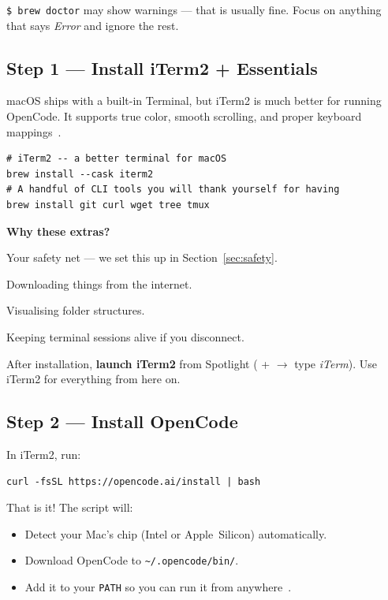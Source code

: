 \documentclass[11pt]{article}
\newcommand{\cmd}[1]{\texttt{\$ #1}}
\newcommand{\key}[1]{\keystroke{#1}}
\newcommand{\keystroke}[1]{%
  \tikz[baseline=(key.base)]{%
    \node[draw, rounded corners=2pt, inner sep=2pt, fill=gray!10,
          font=\ttfamily\small] (key) {#1};%
  }%
}
\begin{document}
\cmd{brew doctor} may show warnings --- that is usually fine.  Focus on anything that says \emph{Error} and ignore the rest.

\subsection{Step 1 --- Install iTerm2 + Essentials}

macOS ships with a built-in Terminal, but iTerm2 is much better for running OpenCode.  It supports true color, smooth scrolling, and proper keyboard mappings~\cite{iterm2026}.

\begin{lstlisting}[style=term]
# iTerm2 -- a better terminal for macOS
brew install --cask iterm2
# A handful of CLI tools you will thank yourself for having
brew install git curl wget tree tmux
\end{lstlisting}

\begin{ex-box}
\textbf{Why these extras?}
\begin{description}[nosep, leftmargin=1.6cm]
  \item[\texttt{git}] Your safety net --- we set this up in Section~\ref{sec:safety}.
  \item[\texttt{curl}/\texttt{wget}] Downloading things from the internet.
  \item[\texttt{tree}] Visualising folder structures.
  \item[\texttt{tmux}] Keeping terminal sessions alive if you disconnect.
\end{description}
\end{ex-box}

After installation, \textbf{launch iTerm2} from Spotlight (\key{Cmd}+\key{Space} $\to$ type \emph{iTerm}).  Use iTerm2 for everything from here on.

\subsection{Step 2 --- Install OpenCode}

In iTerm2, run:

\begin{lstlisting}[style=term]
curl -fsSL https://opencode.ai/install | bash
\end{lstlisting}

That is it!  The script will:
\begin{itemize}[nosep]
  \item[\faCheckCircle] Detect your Mac's chip (Intel or Apple~Silicon) automatically.
  \item[\faCheckCircle] Download OpenCode to \texttt{\textasciitilde/.opencode/bin/}.
  \item[\faCheckCircle] Add it to your \texttt{PATH} so you can run it from anywhere~\cite{opencode_install2026}.
\end{itemize}
\end{document}

